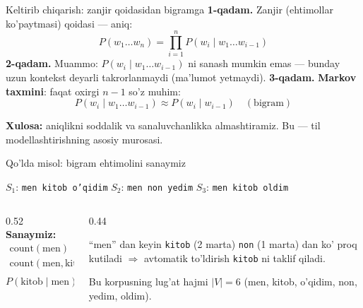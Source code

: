 \documentclass[aspectratio=169,11pt]{beamer}
\begin{document}
\begin{frame}{Keltirib chiqarish: zanjir qoidasidan bigramga}
  \textbf{1-qadam.} Zanjir (ehtimollar ko'paytmasi) qoidasi --- aniq:
  $$ P(w_1 \ldots w_n) = \prod_{i=1}^{n} P(w_i \mid w_1 \ldots w_{i-1}) $$
  \pause
  \textbf{2-qadam.} Muammo: $P(w_i \mid w_1\ldots w_{i-1})$ ni sanash mumkin emas
  --- bunday uzun kontekst deyarli takrorlanmaydi (ma'lumot yetmaydi).
  \pause
  \textbf{3-qadam.} \textbf{Markov taxmini}: faqat oxirgi $n{-}1$ so'z muhim:
  $$ P(w_i \mid w_1\ldots w_{i-1}) \approx P(w_i \mid w_{i-1}) \quad(\text{bigram}) $$
  \begin{tcolorbox}[okbox,top=2pt,bottom=2pt]
    \small \textbf{Xulosa:} aniqlikni soddalik va sanaluvchanlikka almashtiramiz.
    Bu --- til modellashtirishning asosiy murosasi.
  \end{tcolorbox}
\end{frame}

\begin{frame}{Qo'lda misol: bigram ehtimolini sanaymiz}
  \begin{tcolorbox}[defbox,title=Kichik korpus (3 gap)]
    \small
    $S_1$: \texttt{men kitob o'qidim} \quad
    $S_2$: \texttt{men non yedim} \quad
    $S_3$: \texttt{men kitob oldim}
  \end{tcolorbox}
  \vspace{0.2em}
  \begin{columns}[T]
    \begin{column}{0.52\textwidth}
      \textbf{Sanaymiz:}
      \begin{align*}
        \text{count}(\text{men}) &= 3\\
        \text{count}(\text{men},\text{kitob}) &= 2
      \end{align*}
      $$ P(\text{kitob}\mid\text{men}) = \frac{2}{3} \approx \mathbf{0.667} $$
    \end{column}
    \begin{column}{0.44\textwidth}
      \begin{tcolorbox}[okbox,top=2pt,bottom=2pt]
        \footnotesize
        ``men'' dan keyin \texttt{kitob} (2 marta) \texttt{non} (1 marta) dan
        ko' proq kutiladi $\Rightarrow$ avtomatik to'ldirish \texttt{kitob} ni
        taklif qiladi.
      \end{tcolorbox}
      \vspace{3pt}
      \footnotesize\color{halfgray}
      Bu korpusning lug'at hajmi $|V|=6$
      (men, kitob, o'qidim, non, yedim, oldim).
    \end{column}
  \end{columns}
\end{frame}
\end{document}
